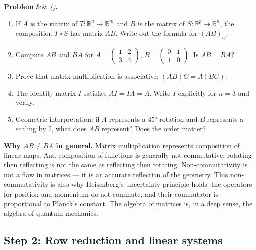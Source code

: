 \documentclass[12pt, a4paper]{article}
\newcounter{problem}
\newenvironment{problem}[1][]{\refstepcounter{problem}\par\vspace{6pt}\noindent\textbf{\color{MidBlue}Problem \theproblem}\ifx&#1&\else\ \textit{(#1)}\fi\textbf{.}\enskip}{\par\vspace{4pt}}
\begin{document}
\begin{problem}
\label{prob:matmul}
\begin{enumerate}[label=(\alph*), topsep=2pt]
  \item If $A$ is the matrix of $T : \mathbb{R}^n \to \mathbb{R}^m$ and $B$ is the matrix of $S : \mathbb{R}^p \to \mathbb{R}^n$, the composition $T \circ S$ has matrix $AB$. Write out the formula for $(AB)_{ij}$.
  \item Compute $AB$ and $BA$ for $A = \begin{pmatrix}1&2\\3&4\end{pmatrix}$, $B = \begin{pmatrix}0&1\\1&0\end{pmatrix}$. Is $AB = BA$?
  \item Prove that matrix multiplication is associative: $(AB)C = A(BC)$.
  \item The identity matrix $I$ satisfies $AI = IA = A$. Write $I$ explicitly for $n=3$ and verify.
  \item Geometric interpretation: if $A$ represents a $45°$ rotation and $B$ represents a scaling by 2, what does $AB$ represent? Does the order matter?
\end{enumerate}
\end{problem}

\begin{thought}
\textbf{Why $AB \neq BA$ in general.}
Matrix multiplication represents composition of linear maps. And composition of functions is generally not commutative: rotating then reflecting is not the same as reflecting then rotating. Non-commutativity is not a flaw in matrices --- it is an accurate reflection of the geometry. This non-commutativity is also why Heisenberg's uncertainty principle holds: the operators for position and momentum do not commute, and their commutator is proportional to Planck's constant. The algebra of matrices is, in a deep sense, the algebra of quantum mechanics.
\end{thought}

\subsection{Step 2: Row reduction and linear systems}
\end{document}
